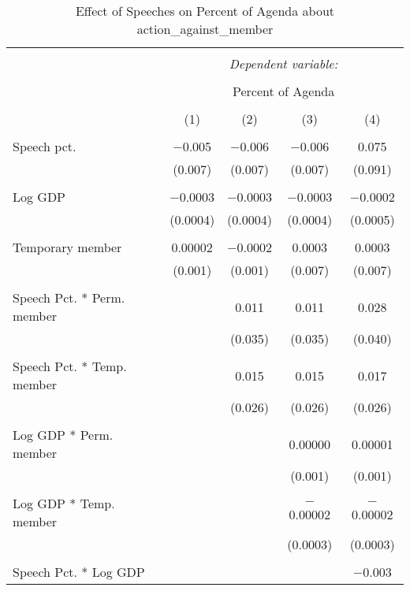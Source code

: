 
\begin{table}[!htbp] \centering 
  \caption{Effect of Speeches on Percent of Agenda about  action_against_member} 
  \label{} 
\begin{tabular}{@{\extracolsep{5pt}}lcccc} 
\\[-1.8ex]\hline 
\hline \\[-1.8ex] 
 & \multicolumn{4}{c}{\textit{Dependent variable:}} \\ 
\cline{2-5} 
\\[-1.8ex] & \multicolumn{4}{c}{Percent of Agenda} \\ 
\\[-1.8ex] & (1) & (2) & (3) & (4)\\ 
\hline \\[-1.8ex] 
 Speech pct. & $-$0.005 & $-$0.006 & $-$0.006 & 0.075 \\ 
  & (0.007) & (0.007) & (0.007) & (0.091) \\ 
  & & & & \\ 
 Log GDP & $-$0.0003 & $-$0.0003 & $-$0.0003 & $-$0.0002 \\ 
  & (0.0004) & (0.0004) & (0.0004) & (0.0005) \\ 
  & & & & \\ 
 Temporary member & 0.00002 & $-$0.0002 & 0.0003 & 0.0003 \\ 
  & (0.001) & (0.001) & (0.007) & (0.007) \\ 
  & & & & \\ 
 Speech Pct. * Perm. member &  & 0.011 & 0.011 & 0.028 \\ 
  &  & (0.035) & (0.035) & (0.040) \\ 
  & & & & \\ 
 Speech Pct. * Temp. member &  & 0.015 & 0.015 & 0.017 \\ 
  &  & (0.026) & (0.026) & (0.026) \\ 
  & & & & \\ 
 Log GDP * Perm. member &  &  & 0.00000 & 0.00001 \\ 
  &  &  & (0.001) & (0.001) \\ 
  & & & & \\ 
 Log GDP * Temp. member &  &  & $-$0.00002 & $-$0.00002 \\ 
  &  &  & (0.0003) & (0.0003) \\ 
  & & & & \\ 
 Speech Pct. * Log GDP &  &  &  & $-$0.003 \\ 

\end{tabular}
\end{table}
